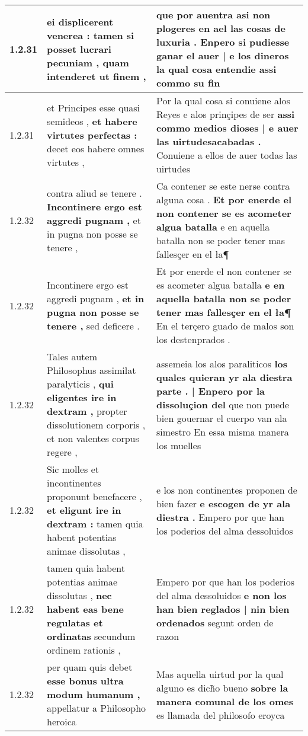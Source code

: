 \begin{tabular}{|p{1cm}|p{6.5cm}|p{6.5cm}|}
1.2.31 & ei displicerent venerea : \textbf{ tamen si posset lucrari pecuniam , } quam intenderet ut finem , & que por auentra asi non plogeres en ael las cosas de luxuria . \textbf{ Enpero si pudiesse ganar el auer | e los dineros la qual cosa entendie } assi commo su fin \\\hline
1.2.31 & et Principes esse quasi semideos , \textbf{ et habere virtutes perfectas : } decet eos habere omnes virtutes , & Por la qual cosa si conuiene alos Reyes e alos prinçipes de ser \textbf{ assi commo medios dioses | e auer las uirtudesacabadas . } Conuiene a ellos de auer todas las uirtudes \\\hline
1.2.32 & contra aliud se tenere . \textbf{ Incontinere ergo est aggredi pugnam , } et in pugna non posse se tenere , & Ca contener se este nerse contra alguna cosa . \textbf{ Et por enerde el non contener se es acometer algua batalla } e en aquella batalla non se poder tener mas fallesçer en el ła¶ \\\hline
1.2.32 & Incontinere ergo est aggredi pugnam , \textbf{ et in pugna non posse se tenere , } sed deficere . & Et por enerde el non contener se es acometer algua batalla \textbf{ e en aquella batalla non se poder tener mas fallesçer en el ła¶ } En el terçero guado de malos son los destenprados . \\\hline
1.2.32 & Tales autem Philosophus assimilat paralyticis , \textbf{ qui eligentes ire in dextram , } propter dissolutionem corporis , et non valentes corpus regere , & assemeia los alos paraliticos \textbf{ los quales quieran yr ala diestra parte . | Enpero por la dissoluçion del } que non puede bien gouernar el cuerpo van ala simestro En essa misma manera los muelles \\\hline
1.2.32 & Sic molles et incontinentes proponunt benefacere , \textbf{ et eligunt ire in dextram : } tamen quia habent potentias animae dissolutas , & e los non continentes proponen de bien fazer \textbf{ e escogen de yr ala diestra . } Empero por que han los poderios del alma dessoluidos \\\hline
1.2.32 & tamen quia habent potentias animae dissolutas , \textbf{ nec habent eas bene regulatas et ordinatas } secundum ordinem rationis , & Empero por que han los poderios del alma dessoluidos \textbf{ e non los han bien reglados | nin bien ordenados } segunt orden de razon \\\hline
1.2.32 & per quam quis debet \textbf{ esse bonus ultra modum humanum , } appellatur a Philosopho heroica & Mas aquella uirtud por la qual alguno es dich̃o bueno \textbf{ sobre la manera comunal de los omes } es llamada del philosofo eroyca \\\hline

\end{tabular}
